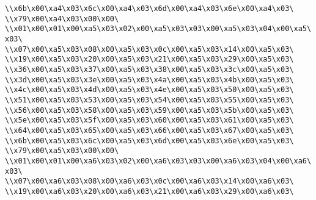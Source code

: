 \verb|\\x6b\x00\xa4\x03\x6c\x00\xa4\x03\x6d\x00\xa4\x03\x6e\x00\xa4\x03\|\newline
\verb|\\x79\x00\xa4\x03\x00\x00\|\newline
\verb|\\x01\x00\x01\x00\xa5\x03\x02\x00\xa5\x03\x03\x00\xa5\x03\x04\x00\xa5\x03\|\newline
\verb|\\x07\x00\xa5\x03\x08\x00\xa5\x03\x0c\x00\xa5\x03\x14\x00\xa5\x03\|\newline
\verb|\\x19\x00\xa5\x03\x20\x00\xa5\x03\x21\x00\xa5\x03\x29\x00\xa5\x03\|\newline
\verb|\\x36\x00\xa5\x03\x37\x00\xa5\x03\x38\x00\xa5\x03\x3c\x00\xa5\x03\|\newline
\verb|\\x3d\x00\xa5\x03\x3e\x00\xa5\x03\x4a\x00\xa5\x03\x4b\x00\xa5\x03\|\newline
\verb|\\x4c\x00\xa5\x03\x4d\x00\xa5\x03\x4e\x00\xa5\x03\x50\x00\xa5\x03\|\newline
\verb|\\x51\x00\xa5\x03\x53\x00\xa5\x03\x54\x00\xa5\x03\x55\x00\xa5\x03\|\newline
\verb|\\x56\x00\xa5\x03\x58\x00\xa5\x03\x59\x00\xa5\x03\x5b\x00\xa5\x03\|\newline
\verb|\\x5e\x00\xa5\x03\x5f\x00\xa5\x03\x60\x00\xa5\x03\x61\x00\xa5\x03\|\newline
\verb|\\x64\x00\xa5\x03\x65\x00\xa5\x03\x66\x00\xa5\x03\x67\x00\xa5\x03\|\newline
\verb|\\x6b\x00\xa5\x03\x6c\x00\xa5\x03\x6d\x00\xa5\x03\x6e\x00\xa5\x03\|\newline
\verb|\\x79\x00\xa5\x03\x00\x00\|\newline
\verb|\\x01\x00\x01\x00\xa6\x03\x02\x00\xa6\x03\x03\x00\xa6\x03\x04\x00\xa6\x03\|\newline
\verb|\\x07\x00\xa6\x03\x08\x00\xa6\x03\x0c\x00\xa6\x03\x14\x00\xa6\x03\|\newline
\verb|\\x19\x00\xa6\x03\x20\x00\xa6\x03\x21\x00\xa6\x03\x29\x00\xa6\x03\|\newline
